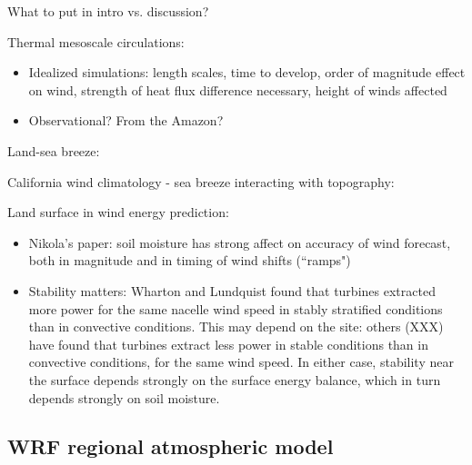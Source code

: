 \documentclass[12pt]{amsart}
\begin{document}
What to put in intro vs. discussion?

Thermal mesoscale circulations:
\begin{itemize}
\item Idealized simulations: length scales, time to develop, order of magnitude effect on wind, strength of heat flux difference necessary, height of winds affected
\item Observational?  From the Amazon?
\end{itemize}

Land-sea breeze:

California wind climatology - sea breeze interacting with topography:

Land surface in wind energy prediction:
\begin{itemize}
\item Nikola's paper: soil moisture has strong affect on accuracy of wind forecast, both in magnitude and in timing of wind shifts (``ramps")
\item Stability matters: Wharton and Lundquist found that turbines extracted more power for the same nacelle wind speed in stably stratified conditions than in convective conditions.  This may depend on the site: others (XXX) have found that turbines extract less power in stable conditions than in convective conditions, for the same wind speed.  In either case, stability near the surface depends strongly on the surface energy balance, which in turn depends strongly on soil moisture.
\end{itemize}

\subsection{WRF regional atmospheric model}
\end{document}

